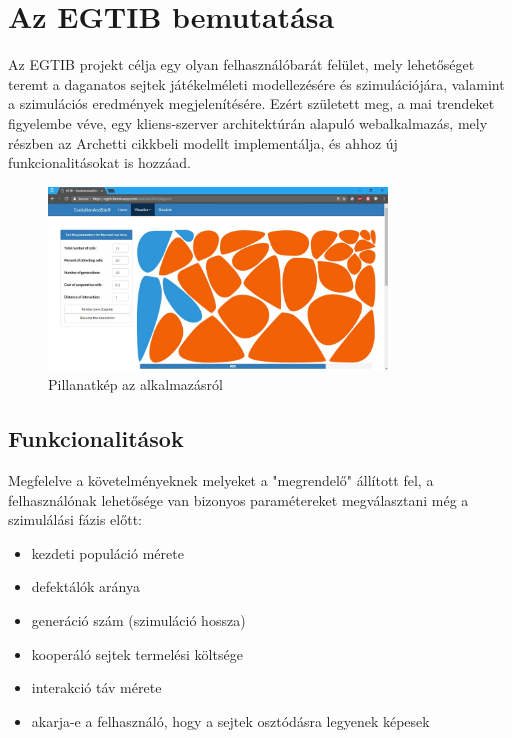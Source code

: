 \newcommand{\projectName}{Az EGTIB}

\section{\projectName{} bemutatása}

\projectName{} projekt célja egy olyan felhasználóbarát felület, mely lehetőséget teremt a daganatos sejtek játékelméleti modellezésére és szimulációjára, valamint a szimulációs eredmények megjelenítésére. Ezért született meg, a mai trendeket figyelembe véve, egy kliens-szerver architektúrán alapuló webalkalmazás, mely részben az Archetti\cite{archetti2013evolutionary} cikkbeli modellt implementálja, és ahhoz új funkcionalitásokat is hozzáad.

\begin{figure}[ht!]
	\centering
	\includegraphics[width=90mm]{images/EGTIB.jpg}
	\caption{Pillanatkép az alkalmazásról \label{fig:SimulateWithDiagram}}
\end{figure}

\subsection{Funkcionalitások}

Megfelelve a követelményeknek melyeket a "megrendelő" állított fel, a felhasználónak lehetősége van bizonyos paramétereket megválasztani még a szimulálási fázis előtt:
\begin{itemize}[noitemsep]
	\item kezdeti populáció mérete
	\item defektálók aránya 
	\item generáció szám (szimuláció hossza)
	\item kooperáló sejtek termelési költsége 
	\item interakció táv mérete
	\item akarja-e a felhasználó, hogy a sejtek osztódásra legyenek képesek
\end{itemize}

